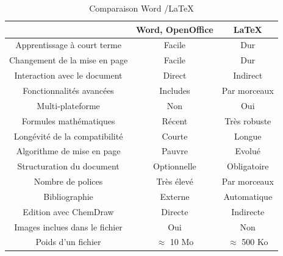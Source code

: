 \begin{itemize}
\begin{table}[ht]
	\centering
	\begin{tabular}{c|cc}
		\hline
		& Word, OpenOffice & \LaTeX   \\
		\hline
		\rowcolor{LightCyan}
		Apprentissage à court terme& Facile & Dur  \\
		Changement de la mise en page& Facile & Dur\\
		\rowcolor{LightCyan}
		Interaction avec le document& Direct & Indirect \\
		Fonctionnalités avancées& Includes & Par morceaux \\
		\rowcolor{LightCyan}
		Multi-plateforme& Non & Oui  \\
		Formules mathématiques& Récent & Très robuste  \\
		\rowcolor{LightCyan}
		Longévité de la compatibilité& Courte & Longue  \\
		Algorithme de mise en page& Pauvre & Evolué\\
		\rowcolor{LightCyan}
		Structuration du document & Optionnelle & Obligatoire \\
		Nombre de polices& Très élevé & Par morceaux \\
		\rowcolor{LightCyan}
		Bibliographie& Externe & Automatique  \\
		Edition avec ChemDraw & Directe & Indirecte  \\
		\rowcolor{LightCyan}
		Images inclues dans le fichier & Oui & Non \\
		Poids d'un fichier & $\approx$ 10 Mo & $\approx$ 500 Ko\\
		\hline
		
	\end{tabular}
	\caption{Comparaison Word /\LaTeX}
\end{table}



\end{itemize}

